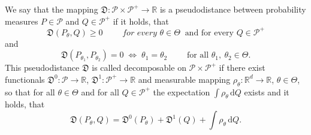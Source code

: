		\begin{definition}
	We say that the mapping $\mathfrak{D}:\mathcal{P}\times\mathcal{P}^+ \rightarrow \mathbb{R}$ is a pseudodistance between probability measures $P \in \mathcal{P}$ and $Q \in \mathcal{P}^+$ if it holds, that	
		\begin{equation}
			\mathfrak{D}(P_\theta,Q) \geq 0 \qquad \textit{ for every } \theta \in \Theta \: \text{ and for every } Q \in \mathcal{P}^+
		\end{equation}
		and 		
		\begin{equation}
			\mathfrak{D}(P_{\theta_1},P_{\theta_2})=0 \; \Leftrightarrow \; \theta_1=\theta_2 \qquad \text{ for all } \theta_1,\: \theta_2 \in \Theta.
		\end{equation}	
	This pseudodistance $\mathfrak{D}$ is called decomposable on $\mathcal{P}\times\mathcal{P}^+$ if there exist functionals 
		 $\mathfrak{D}^0:\mathcal{P}\rightarrow\mathbb{R}$, $ \mathfrak{D}^1:\mathcal{P}^+ \rightarrow \mathbb{R}$ and measurable mapping
		  $\rho_\theta : \mathbb{R}^d \rightarrow \mathbb{R}$, $ \theta \in \Theta$, so that for all $\theta \in \Theta$ and for all $Q \in \mathcal{P}^+$ the expectation $\int{\rho_\theta }\, \mathrm{d}Q$ exists and it holds, that
		\begin{equation}
			\mathfrak{D} (P_\theta, Q) = \mathfrak{D}^0 (P_\theta) + \mathfrak{D}^1 (Q) + \int \rho_\theta \, \mathrm{d}Q.
		\end{equation}
\end{definition}

